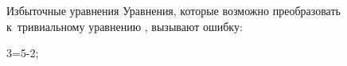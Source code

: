 \begin{frame}{Избыточные уравнения}
Уравнения, которые возможно преобразовать к~тривиальному уравнению
, вызывают ошибку:
\begin{programlisting}
3=5-2;
\end{programlisting}
\begin{screen}
%
%
\end{screen}
\end{frame}
